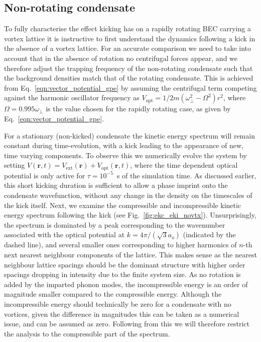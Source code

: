 \subsection{Non-rotating condensate}
To fully characterise the effect kicking has on a rapidly rotating BEC carrying a vortex lattice it is instructive to first understand the dynamics following a kick in the absence of a vortex lattice. For an accurate comparison we need to take into account that in the absence of rotation no centrifugal forces appear, and we therefore adjust the trapping frequency of the non-rotating condensate such that the background densities match that of the rotating condensate. This is achieved from Eq.~\eqref{eqn:vector_potential_gpe} by assuming the centrifugal term competing against the harmonic oscillator frequency  as $V_{\text{opt}} = 1/2m(\omega^2_\perp - \Omega^2)
{r}^2$, where $\Omega=0.995\omega_\perp$ is the value chosen for the rapidly rotating case, as given by Eq.~\eqref{eqn:vector_potential_gpe}.

For a stationary (non-kicked) condensate the kinetic energy spectrum will remain constant during time-evolution, with a kick leading to the appearance of new, time varying components. To observe this we numerically evolve the system by setting $V(\mathbf{r},t) = V_{\text{ext}}(\mathbf{r}) + V_{\text{opt}}(\mathbf{r},t)$, where the time dependent optical potential is only active for $\tau=10^{-5}$~s of the simulation time. As discussed earlier, this short kicking duration is sufficient to allow a phase imprint onto the condensate wavefunction, without any change in the density on the timescales of the kick itself. Next, we examine the compressible and incompressible kinetic energy spectrum following the kick (see Fig.~\ref{fig:ekc_eki_novtx}). Unsurprisingly, the spectrum is dominated by a peak corresponding to the wavenumber associated with the optical potential at $k=4\pi/(\sqrt{3}a_o)$ (indicated by the dashed line), and several smaller ones corresponding to higher harmonics of $n$-th next nearest neighbour components of the lattice. This makes sense as the nearest neighbour lattice spacings should be the dominant structure with higher order spacings dropping in intensity due to the finite system size. As no rotation is added by the imparted phonon modes, the incompressible energy is an order of magnitude smaller compared to the compressible energy. Although the incompressible energy should technically be zero for a condensate with no vortices, given the difference in magnitudes this can be taken as a numerical issue, and can be assumed as zero. Following from this we will therefore restrict the analysis to the compressible part of the spectrum.

